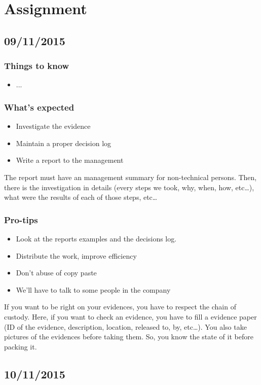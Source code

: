 \section{Assignment}
\subsection{09/11/2015}
\subsubsection{Things to know}
\begin{itemize}
 \item ...
\end{itemize}
\subsubsection{What's expected}
\begin{itemize}
 \item Investigate the evidence
 \item Maintain a proper decision log
 \item Write a report to the management
\end{itemize}
The report must have an management summary for non-technical persons. Then, there is the investigation in details (every steps we took, why, when, how, etc\ldots), what were the results of each of those steps, etc\ldots
\subsubsection{Pro-tips}
\begin{itemize}
 \item Look at the reports examples and the decisions log.
 \item Distribute the work, improve efficiency
 \item Don't abuse of copy paste
 \item We'll have to talk to some people in the company
\end{itemize}
If you want to be right on your evidences, you have to respect the chain of custody. Here, if you want to check an evidence, you have to fill a evidence paper (ID of the evidence, description, location, released to, by, etc\ldots). You also take pictures of the evidences before taking them. So, you know the state of it before packing it.\\
\subsection{10/11/2015}
